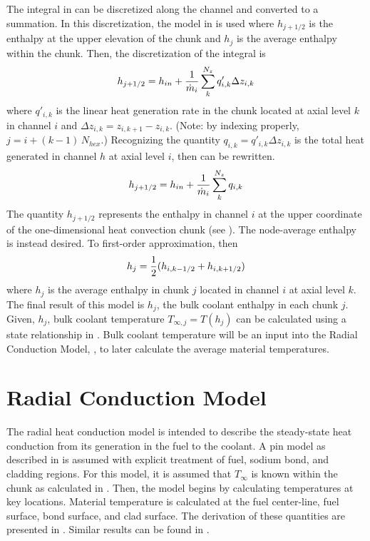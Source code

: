   The integral in  can be discretized along the
  channel and converted to a summation. In this discretization, the model in
   is used where $h_{j+1/2}$ is the enthalpy at the upper
  elevation of the chunk and $h_j$ is the average enthalpy within the chunk.
  Then, the discretization of the integral  is 
  \begin{equation}
    \label{eq:heat_balance}
    h_{j+1/2} = 
      h_{in} + \frac{1}{\dot{m}_i} \sum_{k}^{N_z} q'_{i,k} \Delta z_{i,k}
  \end{equation}
  where $q'_{i,k}$ is the linear heat generation rate in the chunk located at 
  axial level $k$ in channel $i$ and $\Delta z_{i,k} = z_{i,k+1} - z_{i,k}$. 
  (Note: by indexing properly, $j = i + (k-1) \, N_{hex}$.)
  Recognizing the quantity $q_{i,k} = q'_{i,k} \Delta z_{i,k}$
  is the total heat generated in channel $h$ at axial level $i$, then 
   can be rewritten.
  \begin{equation}
    h_{j+1/2} = h_{in} + \frac{1}{\dot{m}_i} \sum_k^{N_z} q_{i,k}
  \end{equation}
  The quantity $h_{j+1/2}$ represents the enthalpy in channel $i$ at the upper 
  coordinate of the one-dimensional heat convection chunk (see
  ). The node-average 
  enthalpy is instead desired. To first-order approximation, then
  \begin{equation}
    h_j = \frac{1}{2} (h_{i,k-1/2}+h_{i,k+1/2})
  \end{equation}
  where $h_j$ is the average enthalpy in chunk $j$ located in channel $i$ at
  axial level $k$.
  The final result of this model is $h_j$, the bulk coolant enthalpy in each
  chunk $j$. Given, $h_j$, bulk coolant temperature $T_{\infty,j} = T(h_j)$ can
  be calculated using a state relationship in \cite{sodiumProp}. Bulk coolant
  temperature will be an input into the Radial Conduction Model, 
  , to later calculate the average material
  temperatures.
  
\section{Radial Conduction Model}
  \label{sec:radial_conduction_model}
  The radial heat conduction model is intended to describe the steady-state heat
  conduction from its generation in the fuel to the coolant. A pin model as
  described in  is assumed with explicit treatment of
  fuel, sodium bond, and cladding regions. For this model, it is assumed that
  $T_{\infty}$ is known within the chunk as calculated in
  . Then, the model begins by calculating
  temperatures at key locations. Material temperature is calculated at the fuel
  center-line, fuel surface, bond surface, and clad surface. The derivation of
  these quantities are presented in . Similar results
  can be found in \cite{FastSpectrumReactors}.
  
